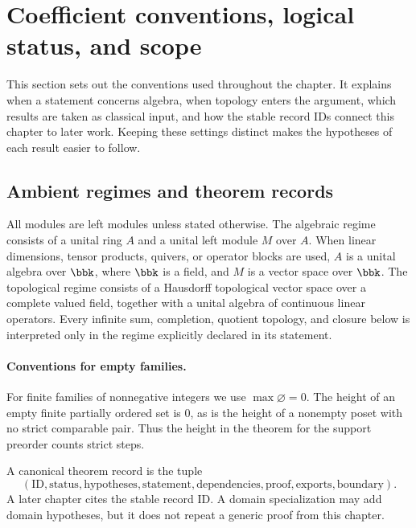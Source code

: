 \section{Coefficient conventions, logical status, and scope}
\begin{readerroadmap}
This section sets out the conventions used throughout the chapter.  It explains when a statement concerns algebra, when topology enters the argument, which results are taken as classical input, and how the stable record IDs connect this chapter to later work.  Keeping these settings distinct makes the hypotheses of each result easier to follow.
\end{readerroadmap}
\subsection{Ambient regimes and theorem records}

\begin{definition}
\label{def:coefficient-regime}
All modules are left modules unless stated otherwise.  The algebraic regime consists of a unital ring $A$ and a unital left module $M$ over $A$.  When linear dimensions, tensor products, quivers, or operator blocks are used, $A$ is a unital algebra over $\bbk$, where $\bbk$ is a field, and $M$ is a vector space over $\bbk$.  The topological regime consists of a Hausdorff topological vector space over a complete valued field, together with a unital algebra of continuous linear operators.  Every infinite sum, completion, quotient topology, and closure below is interpreted only in the regime explicitly declared in its statement.
\end{definition}
\paragraph{Conventions for empty families.} For finite families of nonnegative integers we use $\max\varnothing=0$. The height of an empty finite partially ordered set is $0$, as is the height of a nonempty poset with no strict comparable pair. Thus the height in the theorem for the support preorder counts strict steps.

\begin{definition}
\label{def:theorem-record}
A canonical theorem record is the tuple
\[
(\mathrm{ID},\mathrm{status},\mathrm{hypotheses},\mathrm{statement},
\mathrm{dependencies},\mathrm{proof},\mathrm{exports},\mathrm{boundary}).
\]
A later chapter cites the stable record ID.  A domain specialization may add domain hypotheses, but it does not repeat a generic proof from this chapter.
\end{definition}

